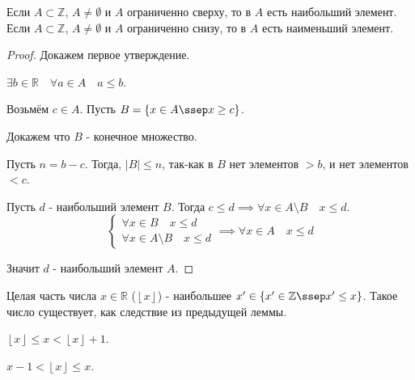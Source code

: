     \begin{lemma}
        Если $A \subset \mathbb{Z}$, $A\neq \emptyset$ и $A$ ограниченно сверху, то в  $A$ есть наибольший элемент.\\
        Если  $A \subset \mathbb{Z}$, $A \neq  \emptyset$ и $A$ ограниченно снизу, то в  $A$ есть наименьший элемент.
         \begin{proof}
            Докажем первое утверждение.
            
            $\exists{b \in \mathbb{R}}\quad \forall{a \in A}\quad a\le b$.

            Возьмём $c\in A$. Пусть $B = \{x\in A\ssep x \ge c\} $.

            Докажем что $B$ - конечное множество.

            Пусть $n=b-c$. Тогда, $|B| \le  n$, так-как в  $B$ нет элементов $>b$, и нет элементов $<c$.

            Пусть $d$ - наибольший элемент $B$. Тогда $c\le d \implies \forall{x\in A\setminus B}\quad x \le  d$.
            \begin{equation*}
                \begin{cases}
                    \forall{x\in B}\quad x \le d\\
                    \forall{x\in A\setminus B}\quad x \le d
                \end{cases} \implies \forall{x\in A}\quad x \le d
            \end{equation*}

            Значит $d$ - наибольший элемент  $A$.
        \end{proof}
    \end{lemma}
    \begin{definition}
        Целая часть числа $x \in \mathbb{R}$ ($\left\lfloor x \right\rfloor$) - наибольшее $x' \in \{x'\in \mathbb{Z}\ssep x' \le  x\} $. Такое число существует, как следствие из предыдущей леммы.
    \end{definition}
    \begin{lemma} $\left\lfloor x \right\rfloor \le x < \left\lfloor x\right\rfloor + 1$. \end{lemma}
    \begin{lemma} $x-1 < \left\lfloor x\right\rfloor \le x$. \end{lemma}
